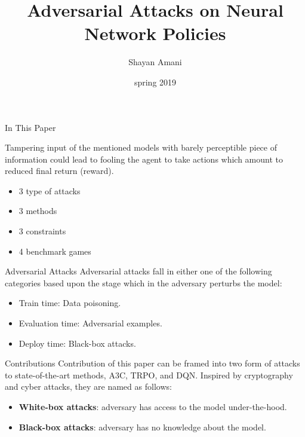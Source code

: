 \documentclass{beamer}
\title{Adversarial Attacks on Neural Network Policies}
\author{Shayan Amani\\}
\date{spring 2019}
\institute{RLRL Weekly Group Meeting}
\begin{document}
  \begin{frame}
    \titlepage
  \end{frame}
  
\begin{frame}{In This Paper}

Tampering input of the mentioned models with barely perceptible piece of information could lead to fooling the agent to take actions which amount to reduced final return (reward).

\begin{itemize}
    \item 3 type of attacks
    \item 3 methods
    \item 3 constraints
    \item 4 benchmark games
\end{itemize}
    
\end{frame}
 
\begin{frame}{Adversarial Attacks}
Adversarial attacks fall in either one of the following categories based upon the stage which in the adversary perturbs the model:
\begin{itemize}
    \item Train time: Data poisoning.
    \item Evaluation time: Adversarial examples.
    \item Deploy time: Black-box attacks.
\end{itemize}
    
\end{frame}

\begin{frame}{Contributions}
Contribution of this paper can be framed into two form of attacks to state-of-the-art methods, A3C, TRPO, and DQN. Inspired by cryptography and cyber attacks, they are named as follows:
\begin{itemize}
    \item \textbf{White-box attacks}: adversary has access to the model under-the-hood.
    \item \textbf{Black-box attacks}: adversary has no knowledge about the model.
\end{itemize}

\end{frame}
\end{document}
